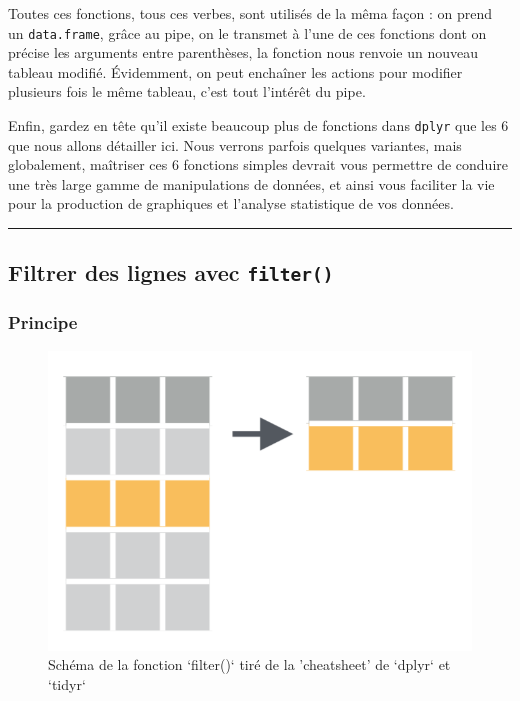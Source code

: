 \documentclass[a4paperpaper,]{article}
\begin{document}
Toutes ces fonctions, tous ces verbes, sont utilisés de la mêma façon : on prend un \texttt{data.frame}, grâce au pipe, on le transmet à l'une de ces fonctions dont on précise les arguments entre parenthèses, la fonction nous renvoie un nouveau tableau modifié. Évidemment, on peut enchaîner les actions pour modifier plusieurs fois le même tableau, c'est tout l'intérêt du pipe.

Enfin, gardez en tête qu'il existe beaucoup plus de fonctions dans \texttt{dplyr} que les 6 que nous allons détailler ici. Nous verrons parfois quelques variantes, mais globalement, maîtriser ces 6 fonctions simples devrait vous permettre de conduire une très large gamme de manipulations de données, et ainsi vous faciliter la vie pour la production de graphiques et l'analyse statistique de vos données.

\begin{center}\rule{0.5\linewidth}{\linethickness}\end{center}

\hypertarget{filtrer-des-lignes-avec-filter}{%
\subsection{\texorpdfstring{Filtrer des lignes avec \texttt{filter()}}{Filtrer des lignes avec filter()}}\label{filtrer-des-lignes-avec-filter}}

\hypertarget{principe}{%
\subsubsection{Principe}\label{principe}}

\begin{figure}[htpb]

{\centering \includegraphics[width=0.5\linewidth]{images/filter} 

}

\caption{Schéma de la fonction `filter()` tiré de la 'cheatsheet' de `dplyr` et `tidyr`}\label{fig:filterfig}
\end{figure}
\end{document}
